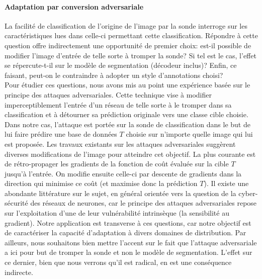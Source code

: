 \paragraph{Adaptation par conversion adversariale}
La facilité de classification de l'origine de l'image par la sonde interroge sur les caractéristiques lues dans celle-ci permettant cette classification. Répondre à cette question offre indirectement une opportunité de premier choix: est-il possible de modifier l'image d'entrée de telle sorte à tromper la sonde? Si tel est le cas, l'effet se répercute-t-il sur le modèle de segmentation (décodeur inclus)? Enfin, ce faisant, peut-on le contraindre à adopter un style d'annotations choisi? \\

Pour étudier ces questions, nous avons mis au point une expérience basée sur le principe des attaques adversariales. Cette technique vise à modifier imperceptiblement l'entrée d'un réseau de telle sorte à le tromper dans sa classification et à détourner sa prédiction originale vers une classe cible choisie. Dans notre cas, l'attaque est portée sur la sonde de classification dans le but de lui faire prédire une base de données $T$ choisie sur n'importe quelle image qui lui est proposée. Les travaux existants sur les attaques adversariales suggèrent diverses modifications de l'image pour atteindre cet objectif. La plus courante est de rétro-propager les gradients de la fonction de coût évaluée sur la cible $T$ jusqu'à l'entrée. On modifie ensuite celle-ci par descente de gradients dans la direction qui minimise ce coût (et maximise donc la prédiction $T$). Il existe une abondante littérature sur le sujet, en général orientée vers la question de la cyber-sécurité des réseaux de neurones, car le principe des attaques adversariales repose sur l'exploitation d'une de leur vulnérabilité intrinsèque (la sensibilité au gradient). Notre application est transverse à ces questions, car notre objectif est de caractériser la capacité d'adaptation à divers domaines de distribution. Par ailleurs, nous souhaitons bien mettre l'accent sur le fait que l'attaque adversariale a ici pour but de tromper la sonde et non le modèle de segmentation. L'effet sur ce dernier, bien que nous verrons qu'il est radical, en est une conséquence indirecte.

